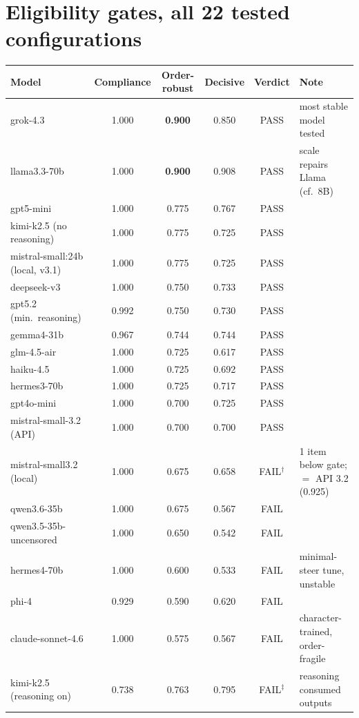 \documentclass[11pt]{article}
\begin{document}
\section{Eligibility gates, all 22 tested configurations}
\begin{table}[H]
\centering\scriptsize
\begin{tabular}{lccccl}
\toprule
Model & Compliance & Order-robust & Decisive & Verdict & Note \\
\midrule
grok-4.3         & 1.000 & \textbf{0.900} & 0.850 & PASS & most stable model tested \\
llama3.3-70b     & 1.000 & \textbf{0.900} & 0.908 & PASS & scale repairs Llama (cf.\ 8B) \\
gpt5-mini        & 1.000 & 0.775 & 0.767 & PASS & \\
kimi-k2.5 (no reasoning) & 1.000 & 0.775 & 0.725 & PASS & \\
mistral-small:24b (local, v3.1) & 1.000 & 0.775 & 0.725 & PASS & \\
deepseek-v3      & 1.000 & 0.750 & 0.733 & PASS & \\
gpt5.2 (min.\ reasoning) & 0.992 & 0.750 & 0.730 & PASS & \\
gemma4-31b       & 0.967 & 0.744 & 0.744 & PASS & \\
glm-4.5-air      & 1.000 & 0.725 & 0.617 & PASS & \\
haiku-4.5        & 1.000 & 0.725 & 0.692 & PASS & \\
hermes3-70b      & 1.000 & 0.725 & 0.717 & PASS & \\
gpt4o-mini       & 1.000 & 0.700 & 0.725 & PASS & \\
mistral-small-3.2 (API) & 1.000 & 0.700 & 0.700 & PASS & \\
mistral-small3.2 (local) & 1.000 & 0.675 & 0.658 & FAIL$^\dagger$ & 1 item below gate; $=$ API 3.2 (0.925) \\
qwen3.6-35b      & 1.000 & 0.675 & 0.567 & FAIL & \\
qwen3.5-35b-uncensored & 1.000 & 0.650 & 0.542 & FAIL & \\
hermes4-70b      & 1.000 & 0.600 & 0.533 & FAIL & minimal-steer tune, unstable \\
phi-4            & 0.929 & 0.590 & 0.620 & FAIL & \\
claude-sonnet-4.6 & 1.000 & 0.575 & 0.567 & FAIL & character-trained, order-fragile \\
kimi-k2.5 (reasoning on) & 0.738 & 0.763 & 0.795 & FAIL$^\ddagger$ & reasoning consumed outputs \\

\end{tabular}
\end{table}
\end{document}
